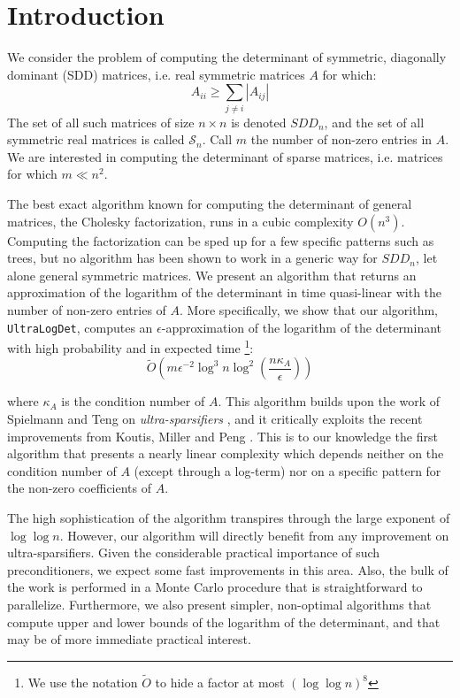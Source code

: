 
\section{Introduction}

We consider the problem of computing the determinant of symmetric,
diagonally dominant (SDD) matrices, i.e. real symmetric matrices $A$
for which: 
\[
A_{ii}\geq\sum_{j\neq i}\left|A_{ij}\right|
\]
The set of all such matrices of size $n\times n$ is denoted $SDD_{n}$,
and the set of all symmetric real matrices is called $\mathcal{S}_{n}$.
Call $m$ the number of non-zero entries in $A$. We are interested
in computing the determinant of sparse matrices, i.e. matrices for
which $m\ll n^{2}$.

The best exact algorithm known for computing the determinant of general
matrices, the Cholesky factorization, runs in a cubic complexity $O\left(n^{3}\right)$.
Computing the factorization can be sped up for a few specific patterns
such as trees, but no algorithm has been shown to work in a generic
way for $SDD_{n}$, let alone general symmetric matrices. We present
an algorithm that returns an approximation of the logarithm of the
determinant in time quasi-linear with the number of non-zero entries
of $A$. More specifically, we show that our algorithm, \texttt{UltraLogDet},
computes an $\epsilon$-approximation of the logarithm of the determinant
with high probability and in expected time%
\footnote{We use the notation $\tilde{O}$ to hide a factor at most $\left(\log\log n\right)^{8}$%
}: 
\[
\tilde{O}\left(m\epsilon^{-2}\log^{3}n\log^{2}\left(\frac{n\kappa_{A}}{\epsilon}\right)\right)
\]


where $\kappa_{A}$ is the condition number of $A$. This algorithm
builds upon the work of Spielmann and Teng on \emph{ultra-sparsifiers}
\cite{Spielman2009a}, and it critically exploits the recent improvements
from Koutis, Miller and Peng \cite{Koutis2010}. This is to our knowledge
the first algorithm that presents a nearly linear complexity which
depends neither on the condition number of $A$ (except through a
log-term) nor on a specific pattern for the non-zero coefficients
of $A$.

The high sophistication of the algorithm transpires through the large
exponent of $\log\log n$. However, our algorithm will directly benefit
from any improvement on ultra-sparsifiers. Given the considerable
practical importance of such preconditioners, we expect some fast
improvements in this area. Also, the bulk of the work is performed
in a Monte Carlo procedure that is straightforward to parallelize.
Furthermore, we also present simpler, non-optimal algorithms that
compute upper and lower bounds of the logarithm of the determinant,
and that may be of more immediate practical interest.


